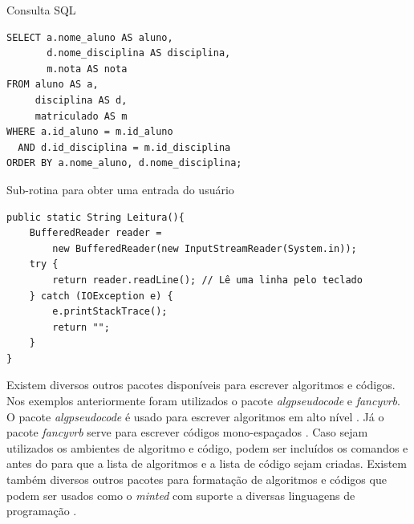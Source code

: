 \begin{codigo}[!htb]
\caption{Consulta SQL} \label{codigo:notas_alunos}
\begin{Verbatim}[frame=lines]
SELECT a.nome_aluno AS aluno,
       d.nome_disciplina AS disciplina,
       m.nota AS nota
FROM aluno AS a,
     disciplina AS d,
     matriculado AS m
WHERE a.id_aluno = m.id_aluno
  AND d.id_disciplina = m.id_disciplina
ORDER BY a.nome_aluno, d.nome_disciplina;
\end{Verbatim}
\end{codigo}

\begin{codigo}[!htb]
\caption{Sub-rotina para obter uma entrada do usuário} \label{codigo:metodo_leitura}
\begin{Verbatim}[frame=lines]
public static String Leitura(){
    BufferedReader reader =
        new BufferedReader(new InputStreamReader(System.in));
    try {
        return reader.readLine(); // Lê uma linha pelo teclado
    } catch (IOException e) {
        e.printStackTrace();
        return "";
    }
}
\end{Verbatim}
\end{codigo}

Existem diversos outros pacotes disponíveis para escrever algoritmos e códigos. Nos exemplos anteriormente foram utilizados o pacote \textit{algpseudocode} e \textit{fancyvrb}. O pacote \textit{algpseudocode} é usado para escrever algoritmos em alto nível \cite{janos:2005:algpseudocode}. Já o pacote \textit{fancyvrb} serve para escrever códigos mono-espaçados \cite{zandt:2010:fancyvrb}.
Caso sejam utilizados os ambientes de algoritmo e código, podem ser incluídos os comandos  e  antes do  para que a lista de algoritmos e a lista de código sejam criadas.
Existem também diversos outros pacotes para formatação de algoritmos e códigos que podem ser usados como o \textit{minted} com suporte a diversas linguagens de programação \cite{poore:2016:minted}.
